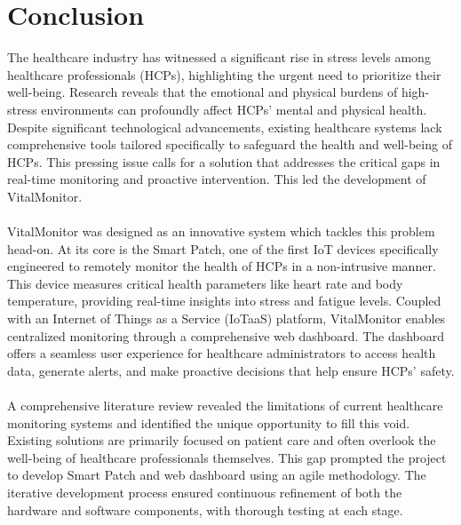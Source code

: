 \newpage

\chapter{Conclusion}


The healthcare industry has witnessed a significant rise in stress levels among healthcare professionals (HCPs), highlighting the urgent need to prioritize their well-being. Research reveals that the emotional and physical burdens of high-stress environments can profoundly affect HCPs' mental and physical health. Despite significant technological advancements, existing healthcare systems lack comprehensive tools tailored specifically to safeguard the health and well-being of HCPs. This pressing issue calls for a solution that addresses the critical gaps in real-time monitoring and proactive intervention. This led the development of VitalMonitor.\\ \\
VitalMonitor was designed as an innovative system which tackles this problem head-on. At its core is the Smart Patch, one of the first IoT devices specifically engineered to remotely monitor the health of HCPs in a non-intrusive manner. This device measures critical health parameters like heart rate and body temperature, providing real-time insights into stress and fatigue levels. Coupled with an Internet of Things as a Service (IoTaaS) platform, VitalMonitor enables centralized monitoring through a comprehensive web dashboard. The dashboard offers a seamless user experience for healthcare administrators to access health data, generate alerts, and make proactive decisions that help ensure HCPs' safety. \\ \\
A comprehensive literature review revealed the limitations of current healthcare monitoring systems and identified the unique opportunity to fill this void. Existing solutions are primarily focused on patient care and often overlook the well-being of healthcare professionals themselves. This gap prompted the project to develop Smart Patch and web dashboard using an agile methodology. The iterative development process ensured continuous refinement of both the hardware and software components, with thorough testing at each stage.\\ \\
